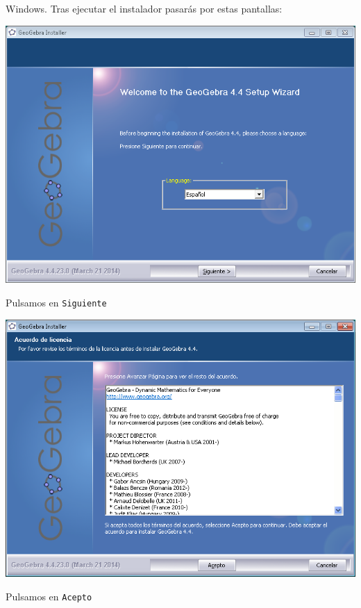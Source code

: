 \documentclass[10pt,a4paper]{article}\usepackage[]{graphicx}\usepackage[]{color}
\begin{document}
Windows. Tras ejecutar el instalador pasarás por estas pantallas:
    \begin{center}
    \includegraphics[width=14cm]{../fig/Tut00-GeoGebraSetup01.png}
    \end{center}
Pulsamos en {\tt Siguiente}
    \begin{center}
    \includegraphics[width=14cm]{../fig/Tut00-GeoGebraSetup02.png}
    \end{center}
Pulsamos en {\tt Acepto}
\end{document}
